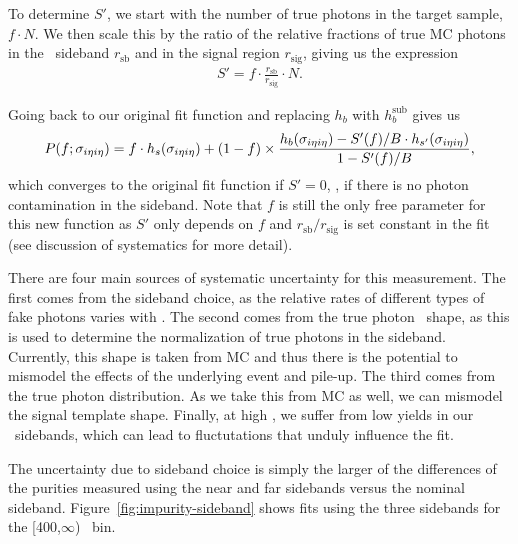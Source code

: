 To determine $S'$, we start with the number of true photons in the target sample, $f \cdot N$. 
We then scale this by the ratio of the relative fractions of true MC photons in the \ICH\ sideband $r_{\text{sb}}$ and in the signal region $r_{\text{sig}}$, giving us the expression
\begin{align}
  S' = f \cdot \frac{r_{\text{sb}}}{r_{\text{sig}}} \cdot N .
\end{align}

Going back to our original fit function and replacing $h_{b}$ with $h_{b}^{\text{sub}}$ gives us
\begin{align}
  P(f;\sigma_{i\eta i\eta}) = f \cdot h_{s}(\sigma_{i\eta i\eta}) + (1 - f) \times \frac{h_{b}(\sigma_{i\eta i\eta}) - S'(f)/B \cdot h_{s'}(\sigma_{i\eta i\eta})}{1 - S'(f)/B},
\end{align}
which converges to the original fit function if $S' = 0$, \ie, if there is no photon contamination in the sideband. 
Note that $f$ is still the only free parameter for this new function as $S'$ only depends on $f$ and $r_{\text{sb}} / r_{\text{sig}}$ is set constant in the fit (see discussion of systematics for more detail).


There are four main sources of systematic uncertainty for this measurement. 
The first comes from the sideband choice, as the relative rates of different types of fake photons varies with \ICH. 
The second comes from the true photon \ICH\ shape, as this is used to determine the normalization of true photons in the sideband. 
Currently, this shape is taken from MC and thus there is the potential to mismodel the effects of the underlying event and pile-up. 
The third comes from the true photon \sieie distribution. 
As we take this from MC as well, we can mismodel the signal template shape. 
Finally, at high \pt, we suffer from low yields in our \ICH\ sidebands, which can lead to
fluctutations that unduly influence the fit.

The uncertainty due to sideband choice is simply the larger of the differences of the purities measured using the near and far sidebands versus the nominal sideband. 
Figure~\ref{fig:impurity-sideband} shows fits using the three sidebands for the [400,$\infty$) \pt\ bin.

